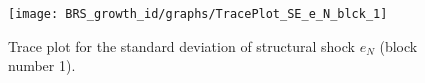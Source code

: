 \begin{figure}[H]
\centering
  \texttt{[image: BRS\_growth\_id/graphs/TracePlot\_SE\_e\_N\_blck\_1]}\\
    \caption{Trace plot for the standard deviation of structural shock ${e_N}$ (block number 1).}
\end{figure}
